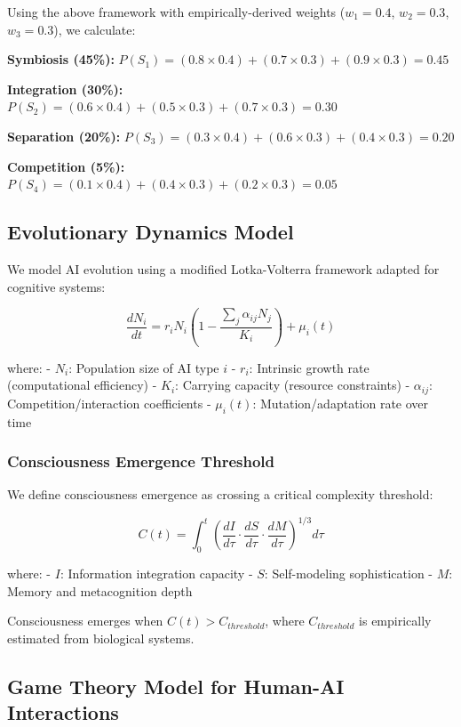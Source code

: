 \documentclass[12pt,a4paper]{article}
\begin{document}
Using the above framework with empirically-derived weights ($w_1 = 0.4$, $w_2 = 0.3$, $w_3 = 0.3$), we calculate:

\textbf{Symbiosis (45\%):} $P(S_1) = (0.8 \times 0.4) + (0.7 \times 0.3) + (0.9 \times 0.3) = 0.45$

\textbf{Integration (30\%):} $P(S_2) = (0.6 \times 0.4) + (0.5 \times 0.3) + (0.7 \times 0.3) = 0.30$

\textbf{Separation (20\%):} $P(S_3) = (0.3 \times 0.4) + (0.6 \times 0.3) + (0.4 \times 0.3) = 0.20$

\textbf{Competition (5\%):} $P(S_4) = (0.1 \times 0.4) + (0.4 \times 0.3) + (0.2 \times 0.3) = 0.05$

\subsection{Evolutionary Dynamics Model}

We model AI evolution using a modified Lotka-Volterra framework adapted for cognitive systems:

\[\frac{dN_i}{dt} = r_i N_i \left(1 - \frac{\sum_{j} \alpha_{ij} N_j}{K_i}\right) + \mu_i(t)\]

where:
- $N_i$: Population size of AI type $i$
- $r_i$: Intrinsic growth rate (computational efficiency)
- $K_i$: Carrying capacity (resource constraints)
- $\alpha_{ij}$: Competition/interaction coefficients
- $\mu_i(t)$: Mutation/adaptation rate over time

\subsubsection{Consciousness Emergence Threshold}

We define consciousness emergence as crossing a critical complexity threshold:

\[C(t) = \int_0^t \left( \frac{dI}{d\tau} \cdot \frac{dS}{d\tau} \cdot \frac{dM}{d\tau} \right)^{1/3} d\tau\]

where:
- $I$: Information integration capacity
- $S$: Self-modeling sophistication
- $M$: Memory and metacognition depth

Consciousness emerges when $C(t) > C_{threshold}$, where $C_{threshold}$ is empirically estimated from biological systems.

\subsection{Game Theory Model for Human-AI Interactions}
\end{document}
